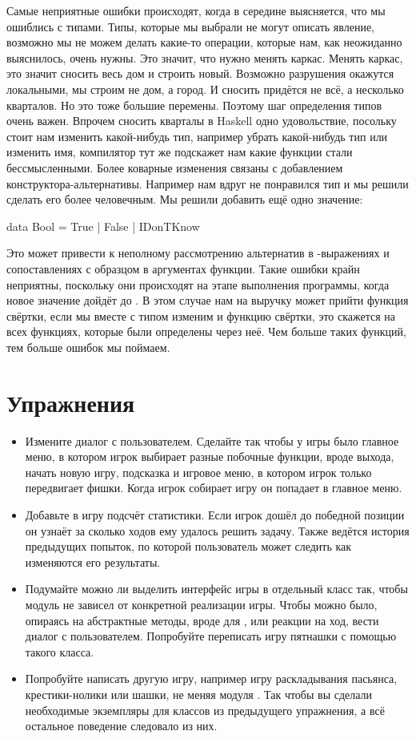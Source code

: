 Самые неприятные ошибки происходят, когда в середине выясняется, что мы
ошиблись с типами. Типы, которые мы выбрали не могут описать явление,
возможно мы не можем делать какие-то операции, которые нам, как
неожиданно выяснилось, очень нужны. Это значит, что нужно менять каркас.
Менять каркас, это значит сносить весь дом и строить новый. Возможно
разрушения окажутся локальными, мы строим не дом, а город. И сносить
придётся не всё, а несколько кварталов. Но это тоже большие перемены.
Поэтому шаг определения типов очень важен. Впрочем сносить кварталы в
Haskell одно удовольствие, посольку стоит нам изменить какой-нибудь тип,
например убрать какой-нибудь тип или изменить имя, компилятор тут же
подскажет нам какие функции стали бессмысленными. Более коварные
изменения связаны с добавлением конструктора-альтернативы. Например нам
вдруг не понравился тип  и мы решили сделать его более
человечным. Мы решили добавить ещё одно значение:


\begin{code}
data Bool = True | False | IDonTKnow
\end{code}

Это может привести к неполному рассмотрению альтернатив в
-выражениях и сопоставлениях с образцом в аргументах функции.
Такие ошибки крайн неприятны, поскольку они происходят на этапе
выполнения программы, когда новое значение  дойдёт до
. В этом случае нам на выручку может прийти функция свёртки,
если мы вместе с типом изменим и функцию свёртки, это скажется на всех
функциях, которые были определены через неё. Чем больше таких функций,
тем больше ошибок мы поймаем.

\section{Упражнения}

\begin{itemize}
\item
  Измените диалог с пользователем. Сделайте так чтобы у игры было
  главное меню, в котором игрок выбирает разные побочные функции, вроде
  выхода, начать новую игру, подсказка и игровое меню, в котором игрок
  только передвигает фишки. Когда игрок собирает игру он попадает в
  главное меню.
\item
  Добавьте в игру подсчёт статистики. Если игрок дошёл до победной
  позиции он узнаёт за сколько ходов ему удалось решить задачу. Также
  ведётся история предыдущих попыток, по которой пользователь может
  следить как изменяются его результаты.
\item
  Подумайте можно ли выделить интерфейс игры в отдельный класс так,
  чтобы модуль  не зависел от конкретной реализации игры. Чтобы
  можно было, опираясь на абстрактные методы, вроде  для
  , или реакции на ход, вести диалог с пользователем.
  Попробуйте переписать игру пятнашки с помощью такого класса.
\item
  Попробуйте написать другую игру, например игру раскладывания пасьянса,
  крестики-нолики или шашки, не меняя модуля . Так чтобы вы
  сделали необходимые экземпляры для классов из предыдущего упражнения,
  а всё остальное поведение следовало из них.
\end{itemize}
